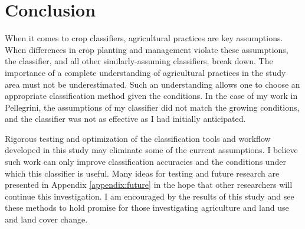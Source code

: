 \chapter{Conclusion}

When it comes to crop classifiers, agricultural practices are key assumptions. When differences in crop planting and management violate these assumptions, the classifier, and all other similarly-assuming classifiers, break down. The importance of a complete understanding of agricultural practices in the study area must not be underestimated. Such an understanding allows one to choose an appropriate classification method given the conditions. In the case of my work in Pellegrini, the assumptions of my classifier did not match the growing conditions, and the classifier was not as effective as I had initially anticipated.

Rigorous testing and optimization of the classification tools and workflow developed in this study may eliminate some of the current assumptions. I believe such work can only improve classification accuracies and the conditions under which this classifier is useful.  Many ideas for testing and future research are presented in Appendix \ref{appendix:future} in the hope that other researchers will continue this investigation. I am encouraged by the results of this study and see these methods to hold promise for those investigating agriculture and land use and land cover change.
